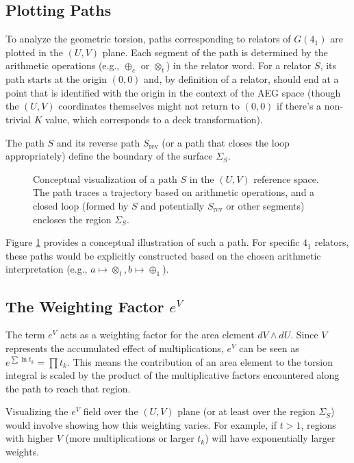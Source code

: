 \documentclass{article}
\begin{document}
\subsection{Plotting Paths}
To analyze the geometric torsion, paths corresponding to relators of $G(4_1)$ are plotted in the $(U,V)$ plane. Each segment of the path is determined by the arithmetic operations (e.g., $\oplus_c$ or $\otimes_t$) in the relator word. For a relator $S$, its path starts at the origin $(0,0)$ and, by definition of a relator, should end at a point that is identified with the origin in the context of the AEG space (though the $(U,V)$ coordinates themselves might not return to $(0,0)$ if there's a non-trivial $K$ value, which corresponds to a deck transformation).

The path $S$ and its reverse path $S_{\text{rev}}$ (or a path that closes the loop appropriately) define the boundary of the surface $\Sigma_S$.

\begin{figure}[h!]
    \centering
    \resizebox{0.8\textwidth}{!}{}
    \caption{Conceptual visualization of a path $S$ in the $(U,V)$ reference space. The path traces a trajectory based on arithmetic operations, and a closed loop (formed by $S$ and potentially $S_{\text{rev}}$ or other segments) encloses the region $\Sigma_S$.}
    \label{fig:uv_path_q2}
\end{figure}

Figure \ref{fig:uv_path_q2} provides a conceptual illustration of such a path. For specific $4_1$ relators, these paths would be explicitly constructed based on the chosen arithmetic interpretation (e.g., $a \mapsto \otimes_t, b \mapsto \oplus_1$).

\subsection{The Weighting Factor $e^V$}
The term $e^V$ acts as a weighting factor for the area element $dV \wedge dU$. Since $V$ represents the accumulated effect of multiplications, $e^V$ can be seen as $e^{\sum \ln t_k} = \prod t_k$. This means the contribution of an area element to the torsion integral is scaled by the product of the multiplicative factors encountered along the path to reach that region.

Visualizing the $e^V$ field over the $(U,V)$ plane (or at least over the region $\Sigma_S$) would involve showing how this weighting varies. For example, if $t > 1$, regions with higher $V$ (more multiplications or larger $t_k$) will have exponentially larger weights.
\end{document}
